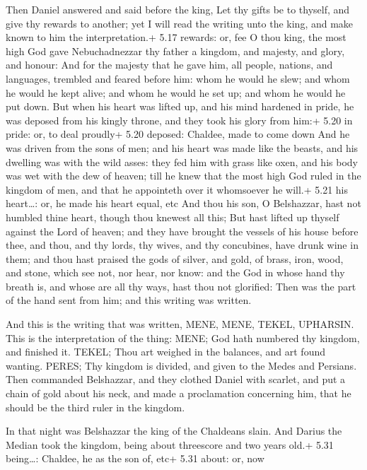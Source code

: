  Then Daniel answered and said before the king, Let thy
gifts be to thyself, and give thy rewards to another; yet I will read
the writing unto the king, and make known to him the interpretation.+
5.17 rewards: or, fee  O thou king, the most high God gave
Nebuchadnezzar thy father a kingdom, and majesty, and glory, and honour:
 And for the majesty that he gave him, all people, nations,
and languages, trembled and feared before him: whom he would he slew;
and whom he would he kept alive; and whom he would he set up; and whom
he would he put down.  But when his heart was lifted up,
and his mind hardened in pride, he was deposed from his kingly throne,
and they took his glory from him:+ 5.20 in pride: or, to deal proudly+
5.20 deposed: Chaldee, made to come down  And he was driven
from the sons of men; and his heart was made like the beasts, and his
dwelling was with the wild asses: they fed him with grass like oxen, and
his body was wet with the dew of heaven; till he knew that the most high
God ruled in the kingdom of men, and that he appointeth over it
whomsoever he will.+ 5.21 his heart\ldots: or, he made his heart equal,
etc  And thou his son, O Belshazzar, hast not humbled thine
heart, though thou knewest all this;  But hast lifted up
thyself against the Lord of heaven; and they have brought the vessels of
his house before thee, and thou, and thy lords, thy wives, and thy
concubines, have drunk wine in them; and thou hast praised the gods of
silver, and gold, of brass, iron, wood, and stone, which see not, nor
hear, nor know: and the God in whose hand thy breath is, and whose are
all thy ways, hast thou not glorified:  Then was the part
of the hand sent from him; and this writing was written.

 And this is the writing that was written, MENE, MENE,
TEKEL, UPHARSIN.  This is the interpretation of the thing:
MENE; God hath numbered thy kingdom, and finished it. 
TEKEL; Thou art weighed in the balances, and art found wanting.
 PERES; Thy kingdom is divided, and given to the Medes and
Persians.  Then commanded Belshazzar, and they clothed
Daniel with scarlet, and put a chain of gold about his neck, and made a
proclamation concerning him, that he should be the third ruler in the
kingdom.

 In that night was Belshazzar the king of the Chaldeans
slain.  And Darius the Median took the kingdom, being about
threescore and two years old.+ 5.31 being\ldots: Chaldee, he as the son
of, etc+ 5.31 about: or, now

